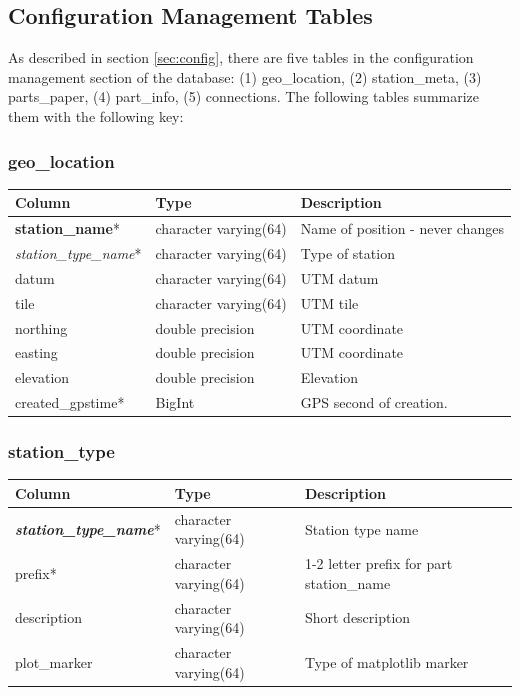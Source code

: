 \documentclass{article}
\begin{document}
{%

\subsection{Configuration Management Tables}
As described in section  \ref{sec:config}, there are five tables in the configuration management section of the database:  (1) geo\_location, (2) station\_meta,
(3) parts\_paper, (4) part\_info, (5) connections.  The following tables summarize them with the following key:

\subsubsection{geo\_location}
\begin{center}
\begin{tabular}{| p{4cm} | p{2cm} | p{10cm} |}
\hline
 {\bf Column} & {\bf Type}  & {\bf Description} \\ [0.5ex]  \hline\hline
{\bf station\_name}*  & character varying(64) & Name of position - never changes \\ \hline
{\em station\_type\_name}* & character varying(64) & Type of station \\ \hline
datum & character varying(64) & UTM datum \\ \hline
tile & character varying(64) & UTM tile \\ \hline
northing & double precision & UTM coordinate \\ \hline
easting & double precision & UTM coordinate \\ \hline
elevation & double precision & Elevation \\ \hline
created\_gpstime* & BigInt & GPS second of creation. \\ \hline
\end{tabular}
\end{center}

\subsubsection{station\_type}
\begin{center}
\begin{tabular}{| p{4cm} | p{2cm} | p{10cm} |}
\hline
 {\bf Column} & {\bf Type}  & {\bf Description} \\ [0.5ex]  \hline\hline
{\bf \em station\_type\_name}* &  character varying(64) &  Station type name \\ \hline
prefix* & character varying(64) & 1-2 letter prefix for part station\_name \\ \hline
description & character varying(64) &  Short description \\ \hline
plot\_marker & character varying(64) & Type of matplotlib marker \\ \hline
\end{tabular}
\end{center}


}
\end{document}
